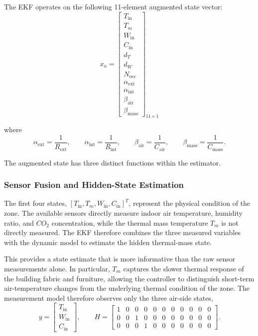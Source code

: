 \documentclass[12pt, a4paper]{article}
\begin{document}
	The EKF operates on the following 11-element augmented state vector:
\begin{equation}
	x_a =
	\begin{bmatrix}
		T_{\mathrm{in}} \\
		T_m \\
		W_{\mathrm{in}} \\
		C_{\mathrm{in}} \\
		d_T \\
		d_W \\
		N_{\mathrm{occ}} \\
		\alpha_{\mathrm{ext}} \\
		\alpha_{\mathrm{int}} \\
		\beta_{\mathrm{air}} \\
		\beta_{\mathrm{mass}}
	\end{bmatrix}_{11\times1}
	\label{eq:augmented_state}
\end{equation}
	
	where
	\begin{equation}
		\alpha_{\mathrm{ext}}=\frac{1}{R_{\mathrm{ext}}},
		\qquad
		\alpha_{\mathrm{int}}=\frac{1}{R_{\mathrm{int}}},
		\qquad
		\beta_{\mathrm{air}}=\frac{1}{C_{\mathrm{air}}},
		\qquad
		\beta_{\mathrm{mass}}=\frac{1}{C_{\mathrm{mass}}}.
	\end{equation}
	
	The augmented state has three distinct functions within the estimator.
	
	\subsubsection{Sensor Fusion and Hidden-State Estimation}
	
	The first four states, $\left[ T_{\mathrm{in}}, T_m, W_{\mathrm{in}}, C_{\mathrm{in}} \right]^T$, represent the physical condition of the zone. The available sensors directly measure indoor air temperature, humidity ratio, and $CO_2$ concentration, while the thermal mass temperature $T_m$ is not directly measured. The EKF therefore combines the three measured variables with the dynamic model to estimate the hidden thermal-mass state.
	
	This provides a state estimate that is more informative than the raw sensor measurements alone. In particular, $T_m$ captures the slower thermal response of the building fabric and furniture, allowing the controller to distinguish short-term air-temperature changes from the underlying thermal condition of the zone. The measurement model therefore observes only the three air-side states,
	\begin{equation}
		y =
		\begin{bmatrix}
			T_{\mathrm{in}} \\
			W_{\mathrm{in}} \\
			C_{\mathrm{in}}
		\end{bmatrix},
		\qquad
		H =
		\begin{bmatrix}
			1&0&0&0&0&0&0&0&0&0&0 \\
			0&0&1&0&0&0&0&0&0&0&0 \\
			0&0&0&1&0&0&0&0&0&0&0
		\end{bmatrix}.
		\label{eq:H_matrix}
	\end{equation}
	
\end{document}
